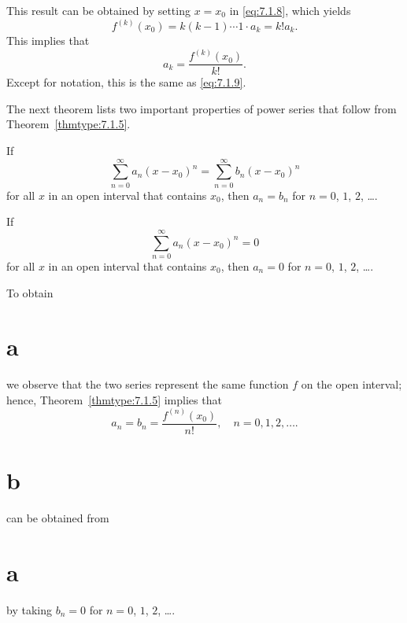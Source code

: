 This result can be obtained by setting $x=x_{0}$ in \eqref{eq:7.1.8}, which yields
\[
  f^{(k)}(x_{0})=k(k-1)\cdots1\cdot a_{k}=k!a_{k}.
\]
This implies that
\[
  a_{k}=\frac{f^{(k)}(x_{0})}{k!}.
\]
Except for notation, this is the same as \eqref{eq:7.1.9}.

The next theorem lists two important properties of power series that follow from
Theorem~\ref{thmtype:7.1.5}.

\begin{theorem}
  \color{blue}
  \label{thmtype:7.1.6}\mbox{}
  \newline
  \begin{alist}
    \item %
    If
    \[
      \sum_{n=0}^{\infty}a_{n}(x-x_{0})^{n}=\sum_{n=0}^{\infty}b_{n}(x-x_{0})^{n}
    \]
    for all $x$ in an open interval that contains $x_{0}$, then $a_{n}=b_{n}$ for $n=0$, $1$, $2$,
    \dots.

    \item %
    If
    \[
      \sum_{n=0}^{\infty}a_{n}(x-x_{0})^{n}=0
    \]
    for all $x$ in an open interval that contains $x_{0}$, then $a_{n}=0$ for $n=0$, $1$, $2$,
    \dots.
  \end{alist}
\end{theorem}

To obtain \part{a} we observe that the two series represent the same function $f$ on the open
interval; hence, Theorem~\ref{thmtype:7.1.5} implies that
\[
  a_{n}=b_{n}=\frac{f^{(n)}(x_{0})}{n!},\quad n=0,1,2,\dots.
\]
\part{b} can be obtained from \part{a} by taking $b_{n}=0$ for $n=0$, $1$, $2$, \dots.


